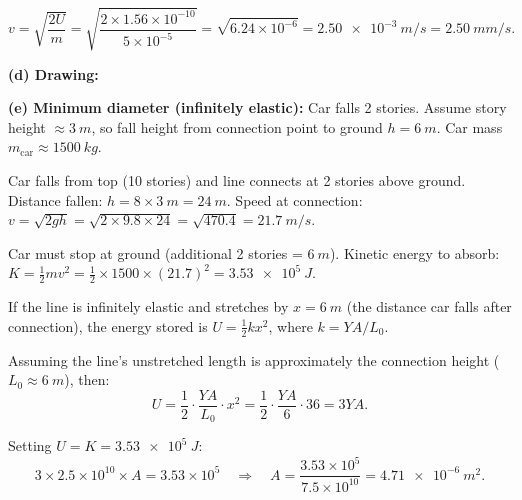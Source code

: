 \documentclass[11pt]{article}
\newcommand{\ans}[1]{\boxed{\displaystyle #1}}
\begin{document}
\[ v = \sqrt{\frac{2U}{m}} = \sqrt{\frac{2 \times 1.56 \times 10^{-10}}{5 \times 10^{-5}}} = \sqrt{6.24 \times 10^{-6}} = \ans{\SI{2.50e-3}{m/s} = \SI{2.50}{mm/s}}. \]

\textbf{(d) Drawing:}
\begin{center}
\end{center}

\textbf{(e) Minimum diameter (infinitely elastic):} Car falls 2 stories. Assume story height $\approx \SI{3}{m}$, so fall height from connection point to ground $h = \SI{6}{m}$. Car mass $m_{\text{car}} \approx \SI{1500}{kg}$.

Car falls from top (10 stories) and line connects at 2 stories above ground. Distance fallen: $h = 8 \times \SI{3}{m} = \SI{24}{m}$. Speed at connection: $v = \sqrt{2gh} = \sqrt{2 \times 9.8 \times 24} = \sqrt{470.4} = \SI{21.7}{m/s}$.

Car must stop at ground (additional 2 stories = $\SI{6}{m}$). Kinetic energy to absorb: $K = \frac{1}{2}mv^2 = \frac{1}{2} \times 1500 \times (21.7)^2 = \SI{3.53e5}{J}$.

If the line is infinitely elastic and stretches by $x = \SI{6}{m}$ (the distance car falls after connection), the energy stored is $U = \frac{1}{2}kx^2$, where $k = YA/L_0$.

Assuming the line's unstretched length is approximately the connection height ($L_0 \approx \SI{6}{m}$), then:
\[ U = \frac{1}{2} \cdot \frac{YA}{L_0} \cdot x^2 = \frac{1}{2} \cdot \frac{YA}{6} \cdot 36 = 3YA. \]

Setting $U = K = \SI{3.53e5}{J}$:
\[ 3 \times 2.5 \times 10^{10} \times A = 3.53 \times 10^5 \quad\Rightarrow\quad A = \frac{3.53 \times 10^5}{7.5 \times 10^{10}} = \SI{4.71e-6}{m^2}. \]
\end{document}
